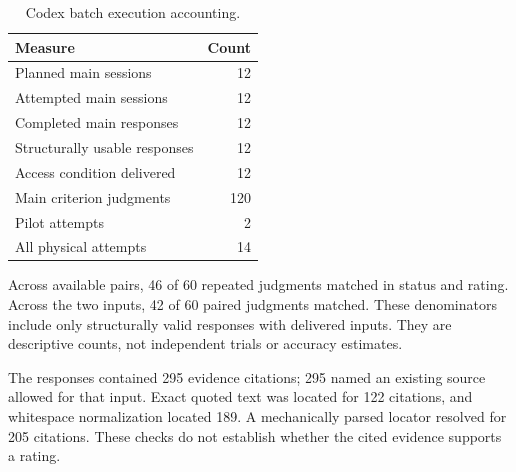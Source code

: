 \begin{table}[t]
\caption{Codex batch execution accounting.}
\label{tab:execution-codex}
\centering\begin{tabular}{lr}\toprule
Measure & Count \\
\midrule
Planned main sessions & 12 \\
Attempted main sessions & 12 \\
Completed main responses & 12 \\
Structurally usable responses & 12 \\
Access condition delivered & 12 \\
Main criterion judgments & 120 \\
Pilot attempts & 2 \\
All physical attempts & 14 \\
\bottomrule\end{tabular}
\end{table}
Across available pairs, 46 of 60 repeated judgments matched in status and rating. Across the two inputs, 42 of 60 paired judgments matched. These denominators include only structurally valid responses with delivered inputs. They are descriptive counts, not independent trials or accuracy estimates.

The responses contained 295 evidence citations; 295 named an existing source allowed for that input. Exact quoted text was located for 122 citations, and whitespace normalization located 189. A mechanically parsed locator resolved for 205 citations. These checks do not establish whether the cited evidence supports a rating.
